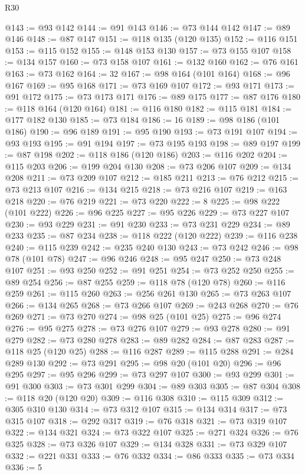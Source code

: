 \begin{lexlean}{R30}
\begin{coremodule}
@143 := @93 @142
@144 := @91 @143
@146 := @73 @144 @142
@147 := @89 @146
@148 := @87 @147
@151 := @118 @135 (@120 @135)
@152 := @116 @151
@153 := @115 @152
@155 := @148 @153 @130
@157 := @73 @155 @107
@158 := @134 @157
@160 := @73 @158 @107
@161 := @132 @160
@162 := @76 @161
@163 := @73 @162
@164 := 32
@167 := @98 @164 (@101 @164)
@168 := @96 @167
@169 := @95 @168
@171 := @73 @169 @107
@172 := @93 @171
@173 := @91 @172
@175 := @73 @173 @171
@176 := @89 @175
@177 := @87 @176
@180 := @118 @164 (@120 @164)
@181 := @116 @180
@182 := @115 @181
@184 := @177 @182 @130
@185 := @73 @184
@186 := 16
@189 := @98 @186 (@101 @186)
@190 := @96 @189
@191 := @95 @190
@193 := @73 @191 @107
@194 := @93 @193
@195 := @91 @194
@197 := @73 @195 @193
@198 := @89 @197
@199 := @87 @198
@202 := @118 @186 (@120 @186)
@203 := @116 @202
@204 := @115 @203
@206 := @199 @204 @130
@208 := @73 @206 @107
@209 := @134 @208
@211 := @73 @209 @107
@212 := @185 @211
@213 := @76 @212
@215 := @73 @213 @107
@216 := @134 @215
@218 := @73 @216 @107
@219 := @163 @218
@220 := @76 @219
@221 := @73 @220
@222 := 8
@225 := @98 @222 (@101 @222)
@226 := @96 @225
@227 := @95 @226
@229 := @73 @227 @107
@230 := @93 @229
@231 := @91 @230
@233 := @73 @231 @229
@234 := @89 @233
@235 := @87 @234
@238 := @118 @222 (@120 @222)
@239 := @116 @238
@240 := @115 @239
@242 := @235 @240 @130
@243 := @73 @242
@246 := @98 @78 (@101 @78)
@247 := @96 @246
@248 := @95 @247
@250 := @73 @248 @107
@251 := @93 @250
@252 := @91 @251
@254 := @73 @252 @250
@255 := @89 @254
@256 := @87 @255
@259 := @118 @78 (@120 @78)
@260 := @116 @259
@261 := @115 @260
@263 := @256 @261 @130
@265 := @73 @263 @107
@266 := @134 @265
@268 := @73 @266 @107
@269 := @243 @268
@270 := @76 @269
@271 := @73 @270
@274 := @98 @25 (@101 @25)
@275 := @96 @274
@276 := @95 @275
@278 := @73 @276 @107
@279 := @93 @278
@280 := @91 @279
@282 := @73 @280 @278
@283 := @89 @282
@284 := @87 @283
@287 := @118 @25 (@120 @25)
@288 := @116 @287
@289 := @115 @288
@291 := @284 @289 @130
@292 := @73 @291
@295 := @98 @20 (@101 @20)
@296 := @96 @295
@297 := @95 @296
@299 := @73 @297 @107
@300 := @93 @299
@301 := @91 @300
@303 := @73 @301 @299
@304 := @89 @303
@305 := @87 @304
@308 := @118 @20 (@120 @20)
@309 := @116 @308
@310 := @115 @309
@312 := @305 @310 @130
@314 := @73 @312 @107
@315 := @134 @314
@317 := @73 @315 @107
@318 := @292 @317
@319 := @76 @318
@321 := @73 @319 @107
@322 := @134 @321
@324 := @73 @322 @107
@325 := @271 @324
@326 := @76 @325
@328 := @73 @326 @107
@329 := @134 @328
@331 := @73 @329 @107
@332 := @221 @331
@333 := @76 @332
@334 := @86 @333
@335 := @73 @334
@336 := 5

\end{coremodule}
\end{lexlean}
